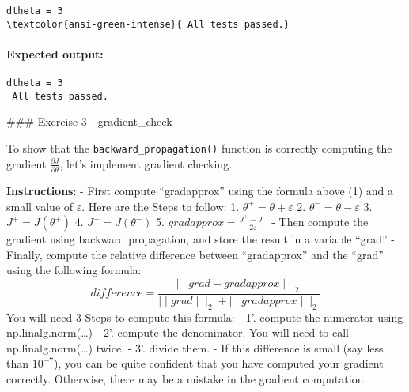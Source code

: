 \documentclass[11pt]{article}
\begin{document}
    \begin{Verbatim}[commandchars=\\\{\}]
dtheta = 3
\textcolor{ansi-green-intense}{ All tests passed.}
    \end{Verbatim}

    \hypertarget{expected-output}{%
\paragraph{Expected output:}\label{expected-output}}

\begin{verbatim}
dtheta = 3
 All tests passed.
\end{verbatim}

    \#\#\# Exercise 3 - gradient\_check

To show that the \texttt{backward\_propagation()} function is correctly
computing the gradient \(\frac{\partial J}{\partial \theta}\), let's
implement gradient checking.

\textbf{Instructions}: - First compute ``gradapprox'' using the formula
above (1) and a small value of \(\varepsilon\). Here are the Steps to
follow: 1. \(\theta^{+} = \theta + \varepsilon\) 2.
\(\theta^{-} = \theta - \varepsilon\) 3. \(J^{+} = J(\theta^{+})\) 4.
\(J^{-} = J(\theta^{-})\) 5.
\(gradapprox = \frac{J^{+} - J^{-}}{2 \varepsilon}\) - Then compute the
gradient using backward propagation, and store the result in a variable
``grad'' - Finally, compute the relative difference between
``gradapprox'' and the ``grad'' using the following formula:
\[ difference = \frac {\mid\mid grad - gradapprox \mid\mid_2}{\mid\mid grad \mid\mid_2 + \mid\mid gradapprox \mid\mid_2} \tag{2}\]
You will need 3 Steps to compute this formula: - 1'. compute the
numerator using np.linalg.norm(\ldots) - 2'. compute the denominator.
You will need to call np.linalg.norm(\ldots) twice. - 3'. divide them. -
If this difference is small (say less than \(10^{-7}\)), you can be
quite confident that you have computed your gradient correctly.
Otherwise, there may be a mistake in the gradient computation.
\end{document}
